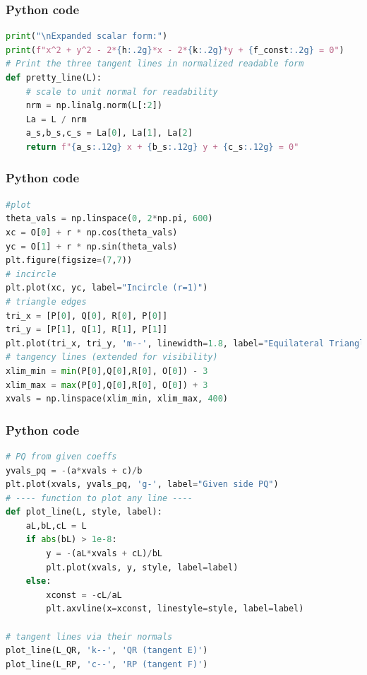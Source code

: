 \documentclass{beamer}
\begin{document}
\begin{frame}[fragile]
    \frametitle{Python code}
    \begin{lstlisting}[language=Python]
print("\nExpanded scalar form:")
print(f"x^2 + y^2 - 2*{h:.2g}*x - 2*{k:.2g}*y + {f_const:.2g} = 0")
# Print the three tangent lines in normalized readable form
def pretty_line(L):
    # scale to unit normal for readability
    nrm = np.linalg.norm(L[:2])
    La = L / nrm
    a_s,b_s,c_s = La[0], La[1], La[2]
    return f"{a_s:.12g} x + {b_s:.12g} y + {c_s:.12g} = 0"
    \end{lstlisting}   
\end{frame}

\begin{frame}[fragile]
    \frametitle{Python code}
    \begin{lstlisting}[language=Python]
#plot
theta_vals = np.linspace(0, 2*np.pi, 600)
xc = O[0] + r * np.cos(theta_vals)
yc = O[1] + r * np.sin(theta_vals)
plt.figure(figsize=(7,7))
# incircle
plt.plot(xc, yc, label="Incircle (r=1)")
# triangle edges
tri_x = [P[0], Q[0], R[0], P[0]]
tri_y = [P[1], Q[1], R[1], P[1]]
plt.plot(tri_x, tri_y, 'm--', linewidth=1.8, label="Equilateral Triangle")
# tangency lines (extended for visibility)
xlim_min = min(P[0],Q[0],R[0], O[0]) - 3
xlim_max = max(P[0],Q[0],R[0], O[0]) + 3
xvals = np.linspace(xlim_min, xlim_max, 400)

    \end{lstlisting}   
\end{frame}
\begin{frame}[fragile]
    \frametitle{Python code}
    \begin{lstlisting}[language=Python]
# PQ from given coeffs
yvals_pq = -(a*xvals + c)/b
plt.plot(xvals, yvals_pq, 'g-', label="Given side PQ")
# ---- function to plot any line ----
def plot_line(L, style, label):
    aL,bL,cL = L
    if abs(bL) > 1e-8:
        y = -(aL*xvals + cL)/bL
        plt.plot(xvals, y, style, label=label)
    else:
        xconst = -cL/aL
        plt.axvline(x=xconst, linestyle=style, label=label)

# tangent lines via their normals
plot_line(L_QR, 'k--', 'QR (tangent E)')
plot_line(L_RP, 'c--', 'RP (tangent F)')

    \end{lstlisting}   
\end{frame}
\end{document}

